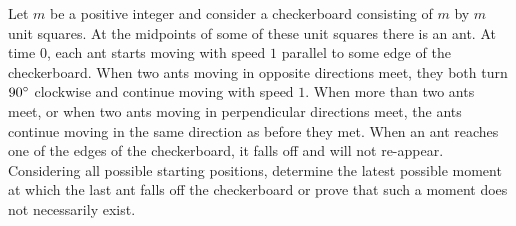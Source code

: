\begin{problem}
Let $m$ be a positive integer and consider a checkerboard consisting of $m$ by $m$ unit squares.
At the midpoints of some of these unit squares there is an ant. At time $0$, each ant starts
moving with speed $1$ parallel to some edge of the checkerboard. When two ants moving in
opposite directions meet, they both turn $90 \degree$ clockwise and continue moving with speed $1$.
When more than two ants meet, or when two ants moving in perpendicular directions meet, the ants continue moving in the same direction as before they met. 
When an ant reaches one of the edges of the checkerboard, it falls off and will not re-appear.
Considering all possible starting positions, determine the latest possible moment at which the last ant falls off the checkerboard or prove that such a moment does not necessarily exist.

\end{problem}

%

